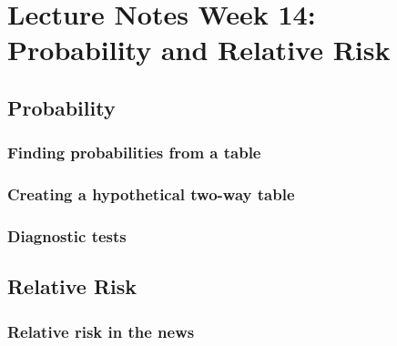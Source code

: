 \documentclass[
]{report}
\begin{document}
\hypertarget{lecture-notes-week-14-probability-and-relative-risk}{%
\section{Lecture Notes Week 14: Probability and Relative Risk}\label{lecture-notes-week-14-probability-and-relative-risk}}

\hypertarget{probability}{%
\subsection*{Probability}\label{probability}}

\hypertarget{finding-probabilities-from-a-table}{%
\subsubsection*{Finding probabilities from a table}\label{finding-probabilities-from-a-table}}

\hypertarget{creating-a-hypothetical-two-way-table}{%
\subsubsection*{Creating a hypothetical two-way table}\label{creating-a-hypothetical-two-way-table}}

\hypertarget{diagnostic-tests}{%
\subsubsection*{Diagnostic tests}\label{diagnostic-tests}}

\hypertarget{relative-risk}{%
\subsection*{Relative Risk}\label{relative-risk}}

\hypertarget{relative-risk-in-the-news}{%
\subsubsection*{Relative risk in the news}\label{relative-risk-in-the-news}}
\end{document}
